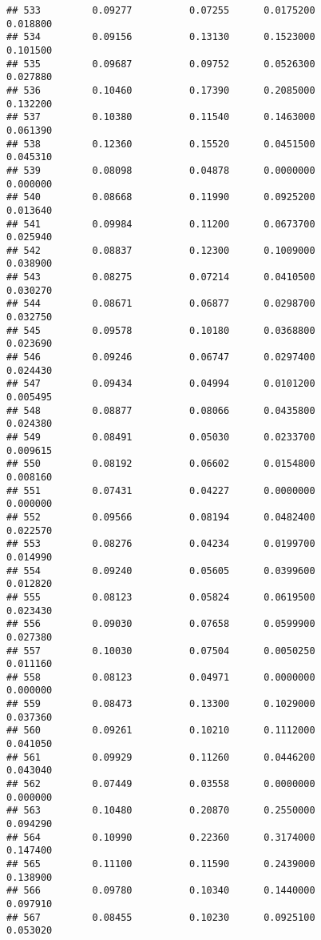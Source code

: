 \documentclass[
]{article}
\begin{document}
\begin{verbatim}
## 533         0.09277          0.07255      0.0175200            0.018800
## 534         0.09156          0.13130      0.1523000            0.101500
## 535         0.09687          0.09752      0.0526300            0.027880
## 536         0.10460          0.17390      0.2085000            0.132200
## 537         0.10380          0.11540      0.1463000            0.061390
## 538         0.12360          0.15520      0.0451500            0.045310
## 539         0.08098          0.04878      0.0000000            0.000000
## 540         0.08668          0.11990      0.0925200            0.013640
## 541         0.09984          0.11200      0.0673700            0.025940
## 542         0.08837          0.12300      0.1009000            0.038900
## 543         0.08275          0.07214      0.0410500            0.030270
## 544         0.08671          0.06877      0.0298700            0.032750
## 545         0.09578          0.10180      0.0368800            0.023690
## 546         0.09246          0.06747      0.0297400            0.024430
## 547         0.09434          0.04994      0.0101200            0.005495
## 548         0.08877          0.08066      0.0435800            0.024380
## 549         0.08491          0.05030      0.0233700            0.009615
## 550         0.08192          0.06602      0.0154800            0.008160
## 551         0.07431          0.04227      0.0000000            0.000000
## 552         0.09566          0.08194      0.0482400            0.022570
## 553         0.08276          0.04234      0.0199700            0.014990
## 554         0.09240          0.05605      0.0399600            0.012820
## 555         0.08123          0.05824      0.0619500            0.023430
## 556         0.09030          0.07658      0.0599900            0.027380
## 557         0.10030          0.07504      0.0050250            0.011160
## 558         0.08123          0.04971      0.0000000            0.000000
## 559         0.08473          0.13300      0.1029000            0.037360
## 560         0.09261          0.10210      0.1112000            0.041050
## 561         0.09929          0.11260      0.0446200            0.043040
## 562         0.07449          0.03558      0.0000000            0.000000
## 563         0.10480          0.20870      0.2550000            0.094290
## 564         0.10990          0.22360      0.3174000            0.147400
## 565         0.11100          0.11590      0.2439000            0.138900
## 566         0.09780          0.10340      0.1440000            0.097910
## 567         0.08455          0.10230      0.0925100            0.053020

\end{verbatim}
\end{document}
